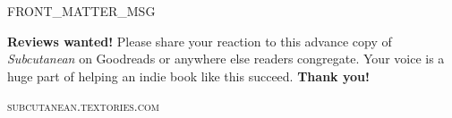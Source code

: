 \thispagestyle{empty}

\vspace*{10\nbs}

\begin{adjustwidth}{4em}{4em}
\begin{parascale}[0.88]
FRONT_MATTER_MSG

\end{parascale}
\end{adjustwidth}

\vspace*{4\nbs}

\begin{center}
\textbf{Reviews wanted!} Please share your reaction to this advance copy of \emph{Subcutanean} on Goodreads or anywhere else readers congregate. Your voice is a huge part of helping an indie book like this succeed. \textbf{Thank you!}

\vspace*{2\nbs}

\textsc{subcutanean.textories.com}
\end{center}

\cleartorecto


